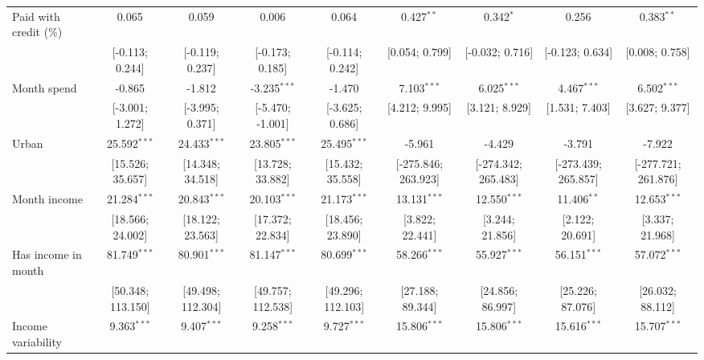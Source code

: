 \begin{table}[htbp]
\begin{threeparttable}[b]
\begin{tabular}{lcccccccc}
         Paid with credit (\%)       & 0.065              & 0.059              & 0.006              & 0.064              & 0.427$^{**}$        & 0.342$^{*}$         & 0.256               & 0.383$^{**}$\\   
                                     & [-0.113; 0.244]    & [-0.119; 0.237]    & [-0.173; 0.185]    & [-0.114; 0.242]    & [0.054; 0.799]      & [-0.032; 0.716]     & [-0.123; 0.634]     & [0.008; 0.758]\\   
         Month spend                 & -0.865             & -1.812             & -3.235$^{***}$     & -1.470             & 7.103$^{***}$       & 6.025$^{***}$       & 4.467$^{***}$       & 6.502$^{***}$\\   
                                     & [-3.001; 1.272]    & [-3.995; 0.371]    & [-5.470; -1.001]   & [-3.625; 0.686]    & [4.212; 9.995]      & [3.121; 8.929]      & [1.531; 7.403]      & [3.627; 9.377]\\   
         Urban                       & 25.592$^{***}$     & 24.433$^{***}$     & 23.805$^{***}$     & 25.495$^{***}$     & -5.961              & -4.429              & -3.791              & -7.922\\   
                                     & [15.526; 35.657]   & [14.348; 34.518]   & [13.728; 33.882]   & [15.432; 35.558]   & [-275.846; 263.923] & [-274.342; 265.483] & [-273.439; 265.857] & [-277.721; 261.876]\\   
         Month income                & 21.284$^{***}$     & 20.843$^{***}$     & 20.103$^{***}$     & 21.173$^{***}$     & 13.131$^{***}$      & 12.550$^{***}$      & 11.406$^{**}$       & 12.653$^{***}$\\   
                                     & [18.566; 24.002]   & [18.122; 23.563]   & [17.372; 22.834]   & [18.456; 23.890]   & [3.822; 22.441]     & [3.244; 21.856]     & [2.122; 20.691]     & [3.337; 21.968]\\   
         Has income in month         & 81.749$^{***}$     & 80.901$^{***}$     & 81.147$^{***}$     & 80.699$^{***}$     & 58.266$^{***}$      & 55.927$^{***}$      & 56.151$^{***}$      & 57.072$^{***}$\\   
                                     & [50.348; 113.150]  & [49.498; 112.304]  & [49.757; 112.538]  & [49.296; 112.103]  & [27.188; 89.344]    & [24.856; 86.997]    & [25.226; 87.076]    & [26.032; 88.112]\\   
         Income variability          & 9.363$^{***}$      & 9.407$^{***}$      & 9.258$^{***}$      & 9.727$^{***}$      & 15.806$^{***}$      & 15.806$^{***}$      & 15.616$^{***}$      & 15.707$^{***}$\\   

\end{tabular}
\end{threeparttable}
\end{table}
